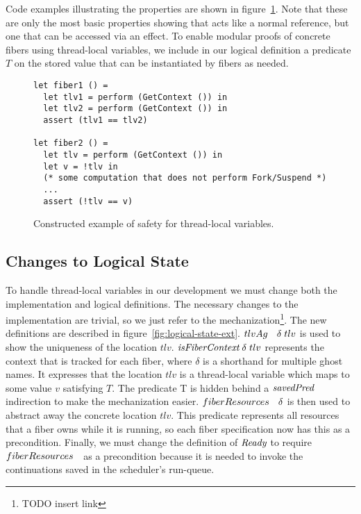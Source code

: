 Code examples illustrating the properties are shown in figure~\ref{fig:tlv-example}.
Note that these are only the most basic properties showing that  acts like a normal reference, but one that can be accessed via an effect.
To enable modular proofs of concrete fibers using thread-local variables, we include in our logical definition a predicate \(T\) on the stored value that can be instantiated by fibers as needed.

\begin{figure}[ht]
    \begin{verbatim}
let fiber1 () =
  let tlv1 = perform (GetContext ()) in
  let tlv2 = perform (GetContext ()) in
  assert (tlv1 == tlv2)

let fiber2 () =
  let tlv = perform (GetContext ()) in
  let v = !tlv in
  (* some computation that does not perform Fork/Suspend *)
  ...
  assert (!tlv == v)
  \end{verbatim}
    \caption{Constructed example of safety for thread-local variables.}
    \label{fig:tlv-example}
\end{figure}

\subsection{Changes to Logical State}

To handle thread-local variables in our development we must change both the implementation and logical definitions.
The necessary changes to the implementation are trivial, so we just refer to the mechanization\footnote{TODO insert link}.
The new definitions are described in figure~\ref{fig:logical-state-ext}.
\(tlvAg~~\; \delta\; tlv\) is used to show the uniqueness of the location \(tlv\).
\(\emph{isFiberContext}{}\; \delta\; tlv\) represents the context that is tracked for each fiber, where \(\delta\) is a shorthand for multiple ghost names.
It expresses that the location \(tlv\) is a thread-local variable which maps to some value \(v\) satisfying \(T\).
The predicate T is hidden behind a \(\emph{savedPred}{}\) indirection to make the mechanization easier.
\(fiberResources~~\; \delta\) is then used to abstract away the concrete location \(tlv\).
This predicate represents all resources that a fiber owns while it is running, so each fiber specification now has this as a precondition.
Finally, we must change the definition of \(\textit{Ready}{}\) to require \(fiberResources~~\) as a precondition because it is needed to invoke the continuations saved in the scheduler's run-queue.

